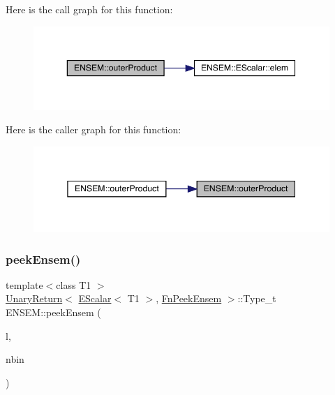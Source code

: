 Here is the call graph for this function\+:
\nopagebreak
\begin{figure}[H]
\begin{center}
\leavevmode
\includegraphics[width=350pt]{d4/dca/group__escalar_gaf54c1015e882e21da36323ae571504dc_cgraph}
\end{center}
\end{figure}
Here is the caller graph for this function\+:
\nopagebreak
\begin{figure}[H]
\begin{center}
\leavevmode
\includegraphics[width=345pt]{d4/dca/group__escalar_gaf54c1015e882e21da36323ae571504dc_icgraph}
\end{center}
\end{figure}
\mbox{\label{group__escalar_ga8fd0207eefa0fd0836dc3f2dffef209e}} 
\subsubsection{\texorpdfstring{peekEnsem()}{peekEnsem()}}
{\footnotesize\ttfamily template$<$class T1 $>$ \\
\mbox{\hyperlink{structENSEM_1_1UnaryReturn}{Unary\+Return}}$<$ \mbox{\hyperlink{classENSEM_1_1EScalar}{E\+Scalar}}$<$ T1 $>$, \mbox{\hyperlink{structENSEM_1_1FnPeekEnsem}{Fn\+Peek\+Ensem}} $>$\+::Type\+\_\+t E\+N\+S\+E\+M\+::peek\+Ensem (\begin{DoxyParamCaption}\item[{const \mbox{\hyperlink{classENSEM_1_1EScalar}{E\+Scalar}}$<$ T1 $>$ \&}]{l,  }\item[{int}]{nbin }\end{DoxyParamCaption})\hspace{0.3cm}{\ttfamily [inline]}}

